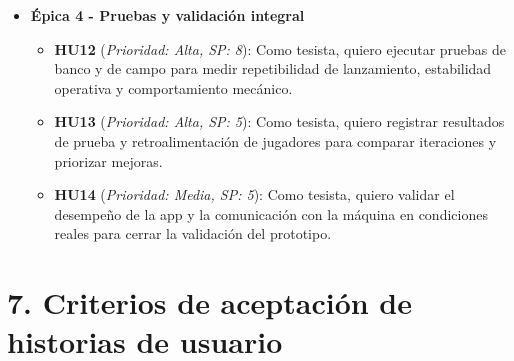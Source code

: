 ﻿\documentclass[
11pt, %
]{charter}
\begin{document}
\begin{itemize}
\begin{itemize}
      \item \textbf{HU10} (\textit{Prioridad: Media, SP: 3}): Como usuario, quiero visualizar el estado mínimo del sistema (conexión, modo y ejecución) para confirmar que los comandos fueron aplicados.
      \item \textbf{HU11} (\textit{Prioridad: Baja, SP: 2, Opcional}): Como usuario, quiero guardar una configuración básica en la app para reutilizarla en la siguiente sesión.
    \end{itemize}
  \item \textbf{\'{E}pica 4 - Pruebas y validación integral}
    \begin{itemize}
      \item \textbf{HU12} (\textit{Prioridad: Alta, SP: 8}): Como tesista, quiero ejecutar pruebas de banco y de campo para medir repetibilidad de lanzamiento, estabilidad operativa y comportamiento mecánico.
      \item \textbf{HU13} (\textit{Prioridad: Alta, SP: 5}): Como tesista, quiero registrar resultados de prueba y retroalimentación de jugadores para comparar iteraciones y priorizar mejoras.
      \item \textbf{HU14} (\textit{Prioridad: Media, SP: 5}): Como tesista, quiero validar el desempeño de la app y la comunicación con la máquina en condiciones reales para cerrar la validación del prototipo.
    \end{itemize}
\end{itemize}

\section{7. Criterios de aceptación de historias de usuario}
\label{sec:criteriosAceptacion}
\end{document}
